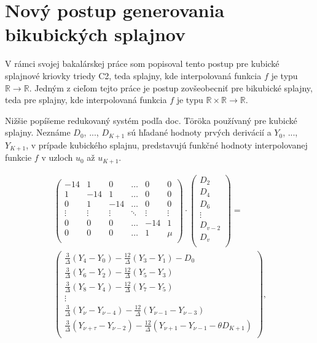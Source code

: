 \documentclass{rnthesis}
\begin{document}
\section*{Nový postup generovania bikubických splajnov}

V rámci svojej bakalárskej práce som popisoval tento postup pre kubické splajnové kriovky triedy C2, teda splajny, kde interpolovaná funkcia $f$ je typu $\mathbb{R} \to \mathbb{R}$. Jedným z cieľom tejto práce je postup zovšeobecniť pre bikubické splajny, teda pre splajny, kde interpolovaná funkcia $f$ je typu $\mathbb{R} \times \mathbb{R} \to \mathbb{R}$.

Nižšie popíšeme redukovaný systém podľa doc. Töröka používaný pre kubické splajny. Neznáme $D_0$, ..., $D_{K+1}$ sú hľadané hodnoty prvých derivácií a $Y_0$, ..., $Y_{K+1}$, v prípade kubického splajnu, predstavujú funkčné hodnoty interpolovanej funkcie $f$ v uzloch $u_0$ až $u_{K+1}$.
 
\begin{multline} \label{eq:reducedL}
\begin{pmatrix}
-14 & 1 & 0 & \hdots & 0 & 0\\
1 & -14 & 1 & \hdots & 0 & 0\\
0 & 1 & -14 & \hdots & 0 & 0\\
\vdots & \vdots & \vdots & \ddots & \vdots & \vdots\\
0 & 0 & 0 & \hdots & -14 & 1 \\
0 & 0 & 0 & \hdots & 1 & \mu\\
\end{pmatrix} 
\cdot
\begin{pmatrix}
D_2\\
D_4\\
D_6\\
\vdots \\
D_{v-2}\\
D_{v}\\
\end{pmatrix}
=\\
\begin{pmatrix}
\frac{3}{\Delta }(Y_4 - Y_0) - \frac{12}{\Delta }(Y_3 - Y_1) - D_0\\
\frac{3}{\Delta }(Y_6 - Y_2) - \frac{12}{\Delta }(Y_5 - Y_3)\\
\frac{3}{\Delta }(Y_8 - Y_4) - \frac{12}{\Delta }(Y_7 - Y_5)\\
\vdots \\
\frac{3}{\Delta }(Y_\nu - Y_{\nu-4}) - \frac{12}{\Delta }(Y_{\nu-1} - Y_{\nu-3})\\
\frac{3}{\Delta }(Y_{\nu+\tau} - Y_{\nu-2}) - \frac{12}{\Delta }(Y_{\nu+1} - Y_{\nu-1} - \theta D_{K+1})\\
\end{pmatrix}\text{,}
\end{multline}
\end{document}
